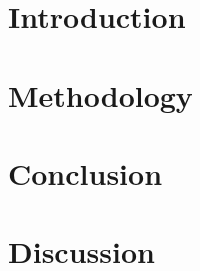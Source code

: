 \documentclass[12pt,a4paper]{article}
\begin{document}
\tableofcontents
\newpage
\listoffigures %
\newpage

\listoftables %
\newpage

\setcounter{page}{1} %


\section{Introduction}
 

\section{Methodology}


\section{Conclusion}


\section{Discussion}

\end{document}
